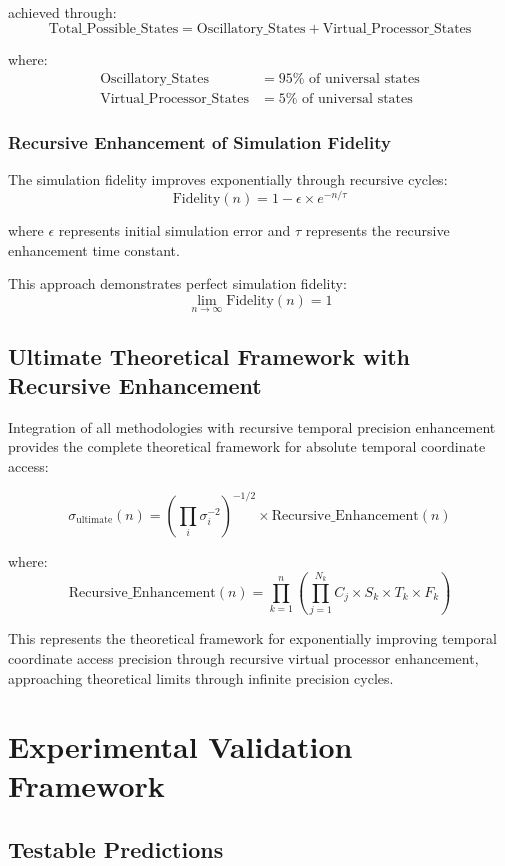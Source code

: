 \documentclass[12pt,a4paper]{article}
\begin{document}
{achieved through:
$$\text{Total\_Possible\_States} = \text{Oscillatory\_States} + \text{Virtual\_Processor\_States}$$

where:
\begin{align}
\text{Oscillatory\_States} &= 95\% \text{ of universal states} \\
\text{Virtual\_Processor\_States} &= 5\% \text{ of universal states}
\end{align}

\subsubsection{Recursive Enhancement of Simulation Fidelity}

The simulation fidelity improves exponentially through recursive cycles:
$$\text{Fidelity}(n) = 1 - \epsilon \times e^{-n/\tau}$$

where $\epsilon$ represents initial simulation error and $\tau$ represents the recursive enhancement time constant.

This approach demonstrates perfect simulation fidelity:
$$\lim_{n \to \infty} \text{Fidelity}(n) = 1$$

\subsection{Ultimate Theoretical Framework with Recursive Enhancement}

Integration of all methodologies with recursive temporal precision enhancement provides the complete theoretical framework for absolute temporal coordinate access:

$$\sigma_{\text{ultimate}}(n) = \left(\prod_{i} \sigma_i^{-2}\right)^{-1/2} \times \text{Recursive\_Enhancement}(n)$$

where:
$$\text{Recursive\_Enhancement}(n) = \prod_{k=1}^{n} \left(\prod_{j=1}^{N_k} C_j \times S_k \times T_k \times F_k\right)$$

This represents the theoretical framework for exponentially improving temporal coordinate access precision through recursive virtual processor enhancement, approaching theoretical limits through infinite precision cycles.

\section{Experimental Validation Framework}

\subsection{Testable Predictions}

}
\end{document}
